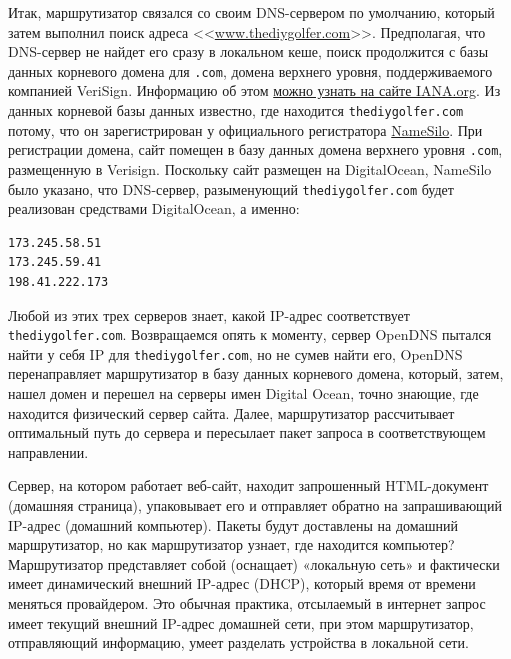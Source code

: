 \documentclass[12pt]{article}
\begin{document}
Итак, маршрутизатор связался со своим DNS-сервером по умолчанию, который затем
выполнил поиск адреса
<<\href{http://www.thediygolfer.com}{www.thediygolfer.com}>>.
Предполагая, что DNS-сервер не найдет его сразу в локальном кеше, поиск продолжится с
базы данных корневого домена для \texttt{.com}, домена верхнего уровня,
поддерживаемого компанией VeriSign. Информацию об этом
\href{https://www.iana.org/domains/root/db/com.html}{можно узнать на сайте
IANA.org}. Из данных корневой базы данных известно, где находится
\texttt{thediygolfer.com} потому, что он зарегистрирован у официального
регистратора
\href{https://www.namesilo.com/register.php?rid=21c9e40dd}{NameSilo}.
При регистрации домена, сайт помещен в базу данных домена верхнего
уровня \texttt{.com}, размещенную в Verisign. Поскольку сайт размещен на
DigitalOcean, NameSilo было указано, что DNS-сервер, разыменующий
\texttt{thediygolfer.com} будет реализован средствами DigitalOcean, а именно:
\begin{verbatim}
173.245.58.51
173.245.59.41
198.41.222.173
\end{verbatim}

Любой из этих трех серверов знает, какой IP-адрес соответствует
\texttt{thediygolfer.com}. Возвращаемся опять к моменту,
сервер OpenDNS пытался найти у себя IP для \texttt{thediygolfer.com}, но не
сумев найти его, OpenDNS перенаправляет маршрутизатор в базу данных
корневого домена, который, затем, нашел домен и перешел на серверы имен
Digital Ocean, точно знающие, где находится физический сервер сайта.
Далее, маршрутизатор рассчитывает оптимальный путь до сервера и пересылает пакет
запроса в соответствующем направлении.

Сервер, на котором работает веб-сайт, находит
запрошенный HTML-документ (домашняя страница), упаковывает его и отправляет
обратно на запрашивающий IP-адрес (домашний компьютер). Пакеты будут
доставлены на домашний маршрутизатор, но как маршрутизатор узнает, где
находится компьютер?
Маршрутизатор представляет собой (оснащает) «локальную сеть» и фактически имеет
динамический внешний IP-адрес (DHCP), который время от времени меняться
провайдером. Это обычная практика, отсылаемый в интернет запрос имеет текущий внешний
IP-адрес домашней сети, при этом маршрутизатор, отправляющий информацию,
умеет разделать устройства в локальной сети.
\end{document}
